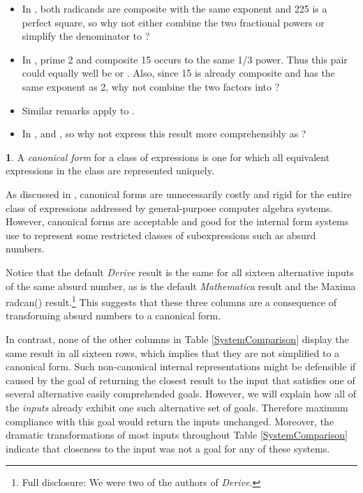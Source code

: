 \documentclass[12pt,english]{article}
\theoremstyle{definition}
\newtheorem*{defn*}{\protect\definitionname}
\theoremstyle{remark}
\theoremstyle{plain}
\theoremstyle{plain}
\providecommand{\definitionname}{Definition}
\begin{document}
\begin{itemize}
\item In , both radicands
are composite with the same exponent and 225 is a perfect square,
so why not either combine the two fractional powers or simplify the
denominator to ?\vspace{-0.4em}

\item In , prime
2 and composite 15 occurs to the same 1/3 power. Thus this pair could
equally well be  or . Also,
since 15 is already composite and has the same exponent as 2, why
not combine the two factors into ?\vspace{-0.4em}

\item Similar remarks apply to .\vspace{-0.4em}

\item In , 
and , so why not express this result more comprehensibly
as ?\vspace{-0.4em}
\end{itemize}
\begin{defn*}
A \textsl{canonical form} for a class of expressions is one for which
all equivalent expressions in the class are represented uniquely.
\end{defn*}
As discussed in \cite{Brown,MosesSimplification,Stoutemyer10commandments},
canonical forms are unnecessarily costly and rigid for the entire
class of expressions addressed by general-purpose computer algebra
systems. However, canonical forms are acceptable and good for the
internal form systems use to represent some restricted classes of
subexpressions such as absurd numbers.

Notice that the default \textsl{Derive} result is the same for all
sixteen alternative inputs of the same absurd number, as is the default
\textsl{Mathematica} result and the Maxima radcan() result.\footnote{Full disclosure: We were two of the authors of \textsl{Derive}.} This suggests that these three columns are a consequence of transforming
absurd numbers to a canonical form. 

In contrast, none of the other columns in Table \ref{SystemComparison}
display the same result in all sixteen rows, which implies that they
are not simplified to a canonical form. Such non-canonical internal
representations might be defensible if caused by the goal of returning
the closest result to the input that satisfies one of several alternative
easily comprehended goals. However, we will explain how all of the
\textsl{inputs} already exhibit one such alternative set of goals.
Therefore maximum compliance with this goal would return the inputs
unchanged. Moreover, the dramatic transformations of most inputs throughout
Table \ref{SystemComparison} indicate that closeness to the input
was not a goal for any of these systems.
\end{document}
